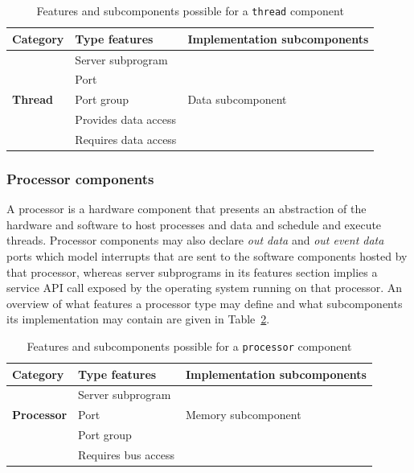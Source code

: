 \begin{table}
\centering
\begin{tabular}{|l|l|l|}
\hline
\textbf{Category} & \textbf{Type features} & \textbf{Implementation
  subcomponents} \\
\hline
 & Server subprogram & \\
 & Port & \\
\textbf{Thread} & Port group & Data subcomponent\\
 & Provides data access & \\
 & Requires data access & \\
\hline
\end{tabular}
\caption{Features and subcomponents possible for a \texttt{thread}
  component}
\label{tab:thread_rules}
\end{table}

\subsubsection{Processor components}
A processor is a hardware component that presents an abstraction of
the hardware and software to host processes and data and schedule and
execute threads. Processor components may also declare \emph{out data}
and \emph{out event data} ports which model interrupts that are sent
to the software components hosted by that processor, whereas server
subprograms in its features section implies a service API call exposed
by the operating system running on that processor. An overview of what
features a processor type may define and what subcomponents its
implementation may contain are given in
Table~\ref{tab:processor_rules}.

\begin{table}
\centering
\begin{tabular}{|l|l|l|}
\hline
\textbf{Category} & \textbf{Type features} & \textbf{Implementation
  subcomponents} \\
\hline
 & Server subprogram & \\
\textbf{Processor} & Port & Memory subcomponent\\
 & Port group & \\
 & Requires bus access & \\
\hline
\end{tabular}
\caption{Features and subcomponents possible for a \texttt{processor}
  component}
\label{tab:processor_rules}
\end{table}


